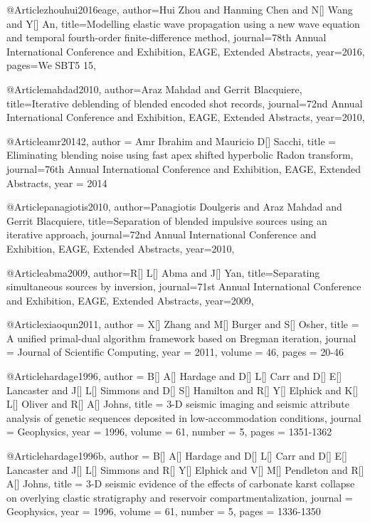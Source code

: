 	




@Article{zhouhui2016eage,
  author={Hui Zhou and Hanming Chen and N[] Wang and Y[] An},
  title={Modelling elastic wave propagation using a new wave equation and temporal fourth-order finite-difference  method},
  journal={78th Annual International Conference and Exhibition, EAGE, Extended Abstracts},
  year=2016,
  pages={We SBT5 15},
}



@Article{mahdad2010,
  author={Araz Mahdad and Gerrit Blacquiere},
  title={Iterative deblending of blended encoded shot records},
  journal={72nd Annual International Conference and Exhibition, EAGE, Extended Abstracts},
  year=2010,
}

@Article{amr20142,
  author = 	 {Amr Ibrahim and Mauricio D[] Sacchi},
  title = 	 {Eliminating blending noise using fast apex shifted hyperbolic Radon transform},
  journal={76th Annual International Conference and Exhibition, EAGE, Extended Abstracts},
  year = 	 2014} 
  
@Article{panagiotis2010,
  author={Panagiotis Doulgeris and Araz Mahdad and Gerrit Blacquiere},
  title={Separation of blended impulsive sources using an iterative approach},
  journal={72nd Annual International Conference and Exhibition, EAGE, Extended Abstracts},
  year=2010,
}

@Article{abma2009,
  author={R[] L[] Abma and J[] Yan},
  title={Separating simultaneous sources by inversion},
  journal={71st Annual International Conference and Exhibition, EAGE, Extended Abstracts},
  year=2009,
}

@Article{xiaoqun2011,
  author = 	 {X[] Zhang and M[] Burger and S[] Osher},
  title = 	 {A unified primal-dual algorithm framework based on Bregman iteration},
  journal = 	 {Journal of Scientific Computing},
  year = 	 2011,
  volume = 	 46,
  pages = 	 {20-46}}
  
  
  
@Article{hardage1996,
  author = 	 {B[] A[] Hardage and D[] L[] Carr and D[] E[] Lancaster and J[] L[] Simmons and D[] S[] Hamilton and R[] Y[] Elphick and K[] L[] Oliver and R[] A[] Johns},
  title = 	 {3-D seismic imaging and seismic attribute analysis of genetic sequences deposited in low‐accommodation conditions},
  journal = 	 {Geophysics},
  year = 	 1996,
  volume = 	 61,
  number = 	 5,
  pages = 	 {1351-1362}}

@Article{hardage1996b,
  author = 	 {B[] A[] Hardage and D[] L[] Carr and D[] E[] Lancaster and J[] L[] Simmons and R[] Y[] Elphick and V[] M[] Pendleton and R[] A[] Johns},
  title = 	 {3-D seismic evidence of the effects of carbonate karst collapse on overlying clastic stratigraphy and reservoir compartmentalization},
  journal = 	 {Geophysics},
  year = 	 1996,
  volume = 	 61,
  number = 	 5,
  pages = 	 {1336-1350}}
 
